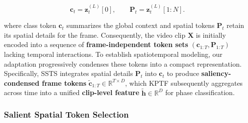 \begin{equation}\mathbf{c}_t = \mathbf{z}_t^{(L)}[0], \qquad \mathbf{P}_t = \mathbf{z}_t^{(L)}[1{:}N].\end{equation}

\noindent where class token $\mathbf{c}_t$ summarizes the global context and spatial tokens $\mathbf{P}_t$ retain its spatial details for the frame. Consequently, the video clip $\mathbf{X}$ is initially encoded into a sequence of \textbf{frame-independent token sets} $(\mathbf{c}_{1:T}, \mathbf{P}_{1:T})$ lacking temporal interactions.
To establish spatiotemporal modeling, our adaptation progressively condenses these tokens into a compact representation.
Specifically, SSTS integrates spatial details $\mathbf{P}_t$ into $\mathbf{c}_t$ to produce \textbf{saliency-condensed frame tokens} $\tilde{\mathbf{c}}_{1:T} \in \mathbb{R}^{T \times D}$, which KPTF subsequently aggregates across time into a unified \textbf{clip-level feature} $\tilde{\mathbf{h}} \in \mathbb{R}^D$ for phase classification.



\subsubsection{Salient Spatial Token Selection}
\label{sec:method:video:spatial}

%
%
%

